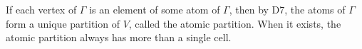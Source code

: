 If each vertex of $\Gamma$ is an element of some atom of $\Gamma$, then by D7, the atoms of $\Gamma$ form a unique partition of $V$, called the atomic partition. When it exists, the atomic partition always has more than a single cell.
